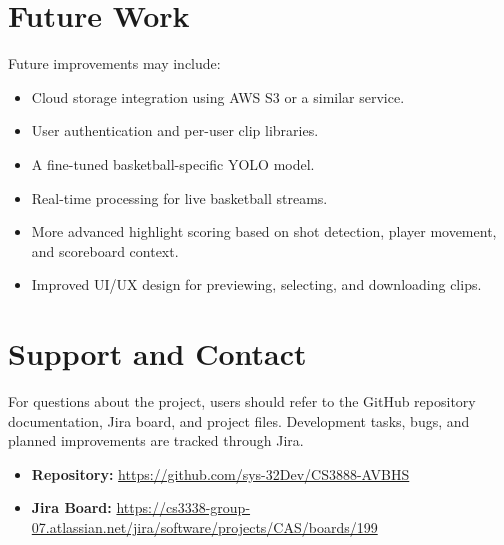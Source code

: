 \documentclass[12pt]{article}
\begin{document}
\section{Future Work}

Future improvements may include:

\begin{itemize}[noitemsep]
    \item Cloud storage integration using AWS S3 or a similar service.
    \item User authentication and per-user clip libraries.
    \item A fine-tuned basketball-specific YOLO model.
    \item Real-time processing for live basketball streams.
    \item More advanced highlight scoring based on shot detection, player movement, and scoreboard context.
    \item Improved UI/UX design for previewing, selecting, and downloading clips.
\end{itemize}

\section{Support and Contact}

For questions about the project, users should refer to the GitHub repository documentation, Jira board, and project files. Development tasks, bugs, and planned improvements are tracked through Jira.

\begin{itemize}[noitemsep]
    \item \textbf{Repository:} \url{https://github.com/sys-32Dev/CS3888-AVBHS}
    \item \textbf{Jira Board:} \url{https://cs3338-group-07.atlassian.net/jira/software/projects/CAS/boards/199}
\end{itemize}
\end{document}
